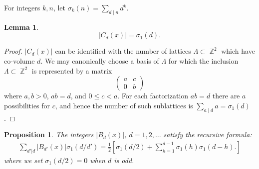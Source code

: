 \documentclass[reqno, 11pt]{amsart}
\newtheorem{proposition}[theorem]{Proposition}
\newtheorem{lemma}[theorem]{Lemma}
\DeclareMathOperator{\Z}{\mathbb{Z}}
\begin{document}
For integers $k,n$, let $\sigma_{k}(n) = \sum_{d \mid n}d^{k}.$

\begin{lemma}
    \label{lemma:isogenies} \[|C_{d}(x)| = \sigma_{1}(d).\]
\end{lemma}

\begin{proof}
    $|C_{d}(x)|$ can be identified with the number of lattices $\Lambda \subset \Z^{2}$ which have co-volume $d$. We may canonically choose a basis of $\Lambda$ for which the inclusion $\Lambda \subset \Z^{2}$ is represented by a matrix \[\begin{pmatrix}
        a & c \\
        0 & b
    \end{pmatrix}\] where $a, b > 0$, $ab=d$, and $0 \leq c < a$.  For each factorization $ab=d$ there are $a$ possibilities for $c$, and hence the number of such sublattices is $\sum_{a \mid d}a = \sigma_{1}(d)$.
\end{proof}

\begin{proposition}
    \label{proposition:recursion} The integers $|B_{d}(x)|$, $d=1,2,\dots$ satisfy the recursive formula: 
    \begin{align}
        \label{equation:recursion} \sum_{d'|d}|B_{d'}(x)|\sigma_{1}(d/d') = \frac{1}{2}\left[ \sigma_{1}(d/2) + \sum_{h=1}^{d-1}\sigma_{1}(h)\sigma_{1}(d-h). \right]
    \end{align}
    where we set $\sigma_{1}(d/2) = 0$ when $d$ is odd.
\end{proposition}
\end{document}

